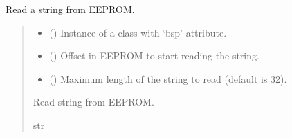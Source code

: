 \documentclass[letterpaper,10pt,english]{sphinxmanual}
\begin{document}
\begin{fulllineitems}
\label{\detokenize{cplddocs:config_ip.read_string}}
\pysigstartsignatures
{}
\pysigstopsignatures
\sphinxAtStartPar
Read a string from EEPROM.
\begin{quote}\begin{description}
\begin{itemize}
\item {} 
\sphinxAtStartPar
{} () \textendash{} Instance of a class with ‘bsp’ attribute.

\item {} 
\sphinxAtStartPar
{} () \textendash{} Offset in EEPROM to start reading the string.

\item {} 
\sphinxAtStartPar
{} () \textendash{} Maximum length of the string to read (default is 32).

\end{itemize}

\sphinxAtStartPar
Read string from EEPROM.

\sphinxAtStartPar
str

\end{description}\end{quote}

\end{fulllineitems}

\end{document}
